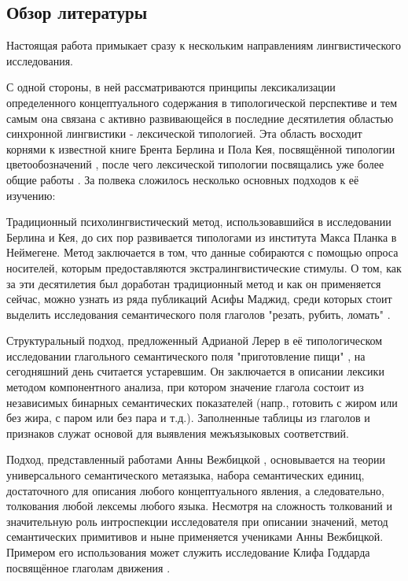 \subsection{Обзор литературы}
Настоящая работа примыкает сразу к нескольким направлениям лингвистического исследования. 

С одной стороны, в ней рассматриваются принципы лексикализации определенного концептуального содержания в типологической перспективе и тем самым она связана с активно развивающейся в последние десятилетия областью синхронной лингвистики - лексической типологией. Эта область восходит корнями к известной книге Брента Берлина и Пола Кея, посвящённой типологии цветообозначений \citep{berlin1969basic}, после чего лексической типологии посвящались уже более общие работы \citep{lehmann1990towards, koptjevskaja2008approaching, krv2015}. За полвека сложилось несколько основных подходов к её изучению:  \begin{enumerate*}[itemjoin={\hskip3mm},after=\hskip3mm,before=\hskip3mm]
    \item Традиционный психолингвистический метод, использовавшийся в исследовании Берлина и Кея, до сих пор развивается типологами из института Макса Планка в Неймегене. Метод заключается в том, что данные собираются с помощью опроса носителей, которым предоставляются экстралингвистические стимулы. О том, как за эти десятилетия был доработан традиционный метод и как он применяется сейчас, можно узнать из ряда публикаций Асифы Маджид, среди которых стоит выделить исследования семантического поля глаголов "резать, рубить, ломать" \citep{majid2007semantic, majid2008cross}.
    \item Структуральный подход, предложенный Адрианой Лерер в её типологическом исследовании глагольного семантического поля "приготовление пищи"  \citep{lehrer1969semantic}, на сегодняшний день считается устаревшим. Он заключается в описании лексики методом компонентного анализа, при котором значение глагола состоит из независимых бинарных семантических показателей (напр., готовить с жиром или без жира, с паром или без пара и т.д.). Заполненные таблицы из глаголов и признаков служат основой для выявления межъязыковых соответствий.
    \item Подход, представленный работами Анны Вежбицкой \citep{wierzbicka1972semantic, goddard1994semantic}, основывается на теории универсального семантического метаязыка, набора семантических единиц, достаточного для описания любого концептуального явления, а следовательно, толкования любой лексемы любого языка. Несмотря на сложность толкований и значительную роль интроспекции исследователя при описании значений, метод семантических примитивов и ныне применяется учениками Анны Вежбицкой. Примером его использования может служить исследование Клифа Годдарда посвящённое глаголам движения \citep{goddard1997semantics}.

\end{enumerate*}
